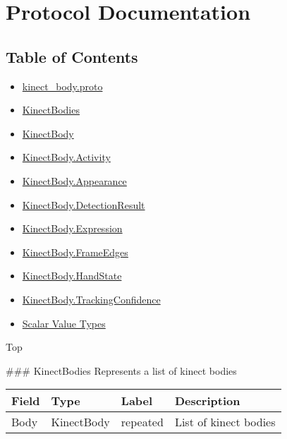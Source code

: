 \section{Protocol Documentation}\label{protocol-documentation}

\subsection{Table of Contents}\label{table-of-contents}

\begin{itemize}
\item
  \hyperref[kinectux5fbody.proto]{kinect\_body.proto}
\item
  \hyperref[experimot.msgs.KinectBodies]{KinectBodies}
\item
  \hyperref[experimot.msgs.KinectBody]{KinectBody}
\item
  \hyperref[experimot.msgs.KinectBody.Activity]{KinectBody.Activity}
\item
  \hyperref[experimot.msgs.KinectBody.Appearance]{KinectBody.Appearance}
\item
  \hyperref[experimot.msgs.KinectBody.DetectionResult]{KinectBody.DetectionResult}
\item
  \hyperref[experimot.msgs.KinectBody.Expression]{KinectBody.Expression}
\item
  \hyperref[experimot.msgs.KinectBody.FrameEdges]{KinectBody.FrameEdges}
\item
  \hyperref[experimot.msgs.KinectBody.HandState]{KinectBody.HandState}
\item
  \hyperref[experimot.msgs.KinectBody.TrackingConfidence]{KinectBody.TrackingConfidence}
\item
  \hyperref[scalar-value-types]{Scalar Value Types}
\end{itemize}

Top


 \#\#\# KinectBodies Represents a list of kinect bodies

\begin{longtable}[c]{@{}llll@{}}
\toprule
Field & Type & Label & Description\tabularnewline
\midrule
\endhead
Body & KinectBody & repeated & List of kinect bodies\tabularnewline
\bottomrule
\end{longtable}

